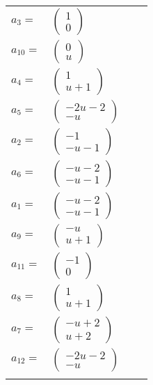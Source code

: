 \documentclass[1p]{elsarticle_modified}
\theoremstyle{definition}
\begin{document}
\begin{tabular}{m{7pt} m{180pt} m{7pt} m{180pt} }
\flushright $a_{3}=$&$\begin{pmatrix}1\\0\end{pmatrix}$ \\
\flushright $a_{10}=$&$\begin{pmatrix}0\\u\end{pmatrix}$ \\
\flushright $a_{4}=$&$\begin{pmatrix}1\\u+1\end{pmatrix}$ \\
\flushright $a_{5}=$&$\begin{pmatrix}-2 u-2\\- u\end{pmatrix}$ \\
\flushright $a_{2}=$&$\begin{pmatrix}-1\\- u-1\end{pmatrix}$ \\
\flushright $a_{6}=$&$\begin{pmatrix}- u-2\\- u-1\end{pmatrix}$ \\
\flushright $a_{1}=$&$\begin{pmatrix}- u-2\\- u-1\end{pmatrix}$ \\
\flushright $a_{9}=$&$\begin{pmatrix}- u\\u+1\end{pmatrix}$ \\
\flushright $a_{11}=$&$\begin{pmatrix}-1\\0\end{pmatrix}$ \\
\flushright $a_{8}=$&$\begin{pmatrix}1\\u+1\end{pmatrix}$ \\
\flushright $a_{7}=$&$\begin{pmatrix}- u+2\\u+2\end{pmatrix}$ \\
\flushright $a_{12}=$&$\begin{pmatrix}-2 u-2\\- u\end{pmatrix}$\\&\end{tabular}
\end{document}
